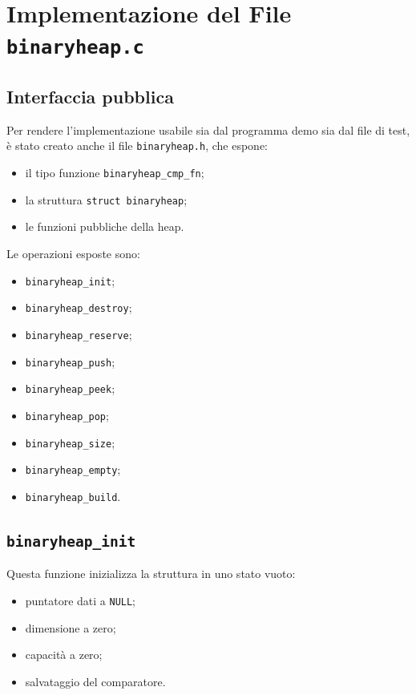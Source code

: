 \documentclass[a4paper,12pt]{article}
\begin{document}
\section{Implementazione del File \texttt{binaryheap.c}}

\subsection{Interfaccia pubblica}

Per rendere l'implementazione usabile sia dal programma demo sia dal file di test, è stato creato anche il file \texttt{binaryheap.h}, che espone:

\begin{itemize}[leftmargin=*]
    \item il tipo funzione \texttt{binaryheap\_cmp\_fn};
    \item la struttura \texttt{struct binaryheap};
    \item le funzioni pubbliche della heap.
\end{itemize}

Le operazioni esposte sono:

\begin{itemize}[leftmargin=*]
    \item \texttt{binaryheap\_init};
    \item \texttt{binaryheap\_destroy};
    \item \texttt{binaryheap\_reserve};
    \item \texttt{binaryheap\_push};
    \item \texttt{binaryheap\_peek};
    \item \texttt{binaryheap\_pop};
    \item \texttt{binaryheap\_size};
    \item \texttt{binaryheap\_empty};
    \item \texttt{binaryheap\_build}.
\end{itemize}

\subsection{\texttt{binaryheap\_init}}

Questa funzione inizializza la struttura in uno stato vuoto:

\begin{itemize}[leftmargin=*]
    \item puntatore dati a \texttt{NULL};
    \item dimensione a zero;
    \item capacità a zero;
    \item salvataggio del comparatore.
\end{itemize}
\end{document}
